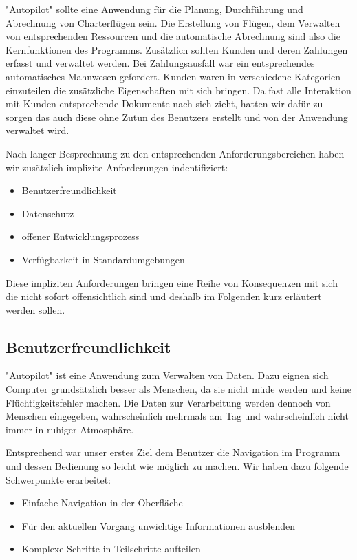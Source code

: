 \documentclass[12pt]{article}
\begin{document}
"Autopilot" sollte eine Anwendung für die Planung, Durchführung und Abrechnung von Charterflügen sein. Die Erstellung von Flügen, dem Verwalten von entsprechenden Ressourcen und die automatische Abrechnung sind also die Kernfunktionen des Programms. Zusätzlich sollten Kunden und deren Zahlungen erfasst und verwaltet werden. Bei Zahlungsausfall war ein entsprechendes automatisches Mahnwesen gefordert. Kunden waren in verschiedene Kategorien einzuteilen die zusätzliche Eigenschaften mit sich bringen. Da fast alle Interaktion mit Kunden entsprechende Dokumente nach sich zieht, hatten wir dafür zu sorgen das auch diese ohne Zutun des Benutzers erstellt und von der Anwendung verwaltet wird.
\newline

Nach langer Besprechnung zu den entsprechenden Anforderungsbereichen haben wir zusätzlich implizite Anforderungen indentifiziert:
\begin{itemize}
  \item Benutzerfreundlichkeit
  \item Datenschutz
  \item offener Entwicklungsprozess
  \item Verfügbarkeit in Standardumgebungen
\end{itemize}
\newline

Diese impliziten Anforderungen bringen eine Reihe von Konsequenzen mit sich die nicht sofort offensichtlich sind und deshalb im Folgenden kurz erläutert werden sollen.

\subsection{Benutzerfreundlichkeit}

"Autopilot" ist eine Anwendung zum Verwalten von Daten. Dazu eignen sich Computer grundsätzlich besser als Menschen, da sie nicht müde werden und keine Flüchtigkeitsfehler machen. Die Daten zur Verarbeitung werden dennoch von Menschen eingegeben, wahrscheinlich mehrmals am Tag und wahrscheinlich nicht immer in ruhiger Atmosphäre.
\newline

Entsprechend war unser erstes Ziel dem Benutzer die Navigation im Programm und dessen Bedienung so leicht wie möglich zu machen. Wir haben dazu folgende Schwerpunkte erarbeitet:
\begin{itemize}
  \item Einfache Navigation in der Oberfläche
  \item Für den aktuellen Vorgang unwichtige Informationen ausblenden
  \item Komplexe Schritte in Teilschritte aufteilen
\end{itemize}
\newline
\end{document}
